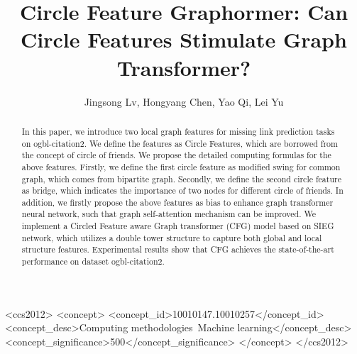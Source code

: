 \documentclass[sigconf]{acmart}
\begin{document}
\title{Circle Feature Graphormer: Can Circle Features Stimulate Graph Transformer?}

\author{Jingsong Lv, Hongyang Chen, Yao Qi, Lei Yu}

\renewcommand{\shortauthors}{Jingsong Lv, et al.}


\begin{abstract}
  In this paper, we introduce two local graph features for missing link prediction tasks on ogbl-citation2. We define the features as Circle Features, which are borrowed from the concept of circle of friends. We propose the detailed computing formulas for the above features. Firstly, we define the first circle feature as modified swing for common graph, which comes from bipartite graph. Secondly, we define the second circle feature as bridge, which indicates the importance of two nodes for different circle of friends. In addition, we firstly propose the above features as bias to enhance graph transformer neural network, such that graph self-attention mechanism can be improved. We implement a Circled Feature aware Graph transformer (CFG) model based on SIEG network, which utilizes a double tower structure to capture both global and local structure features. Experimental results show that CFG achieves the state-of-the-art performance on dataset ogbl-citation2.
\end{abstract}


\begin{CCSXML}
<ccs2012>
   <concept>
       <concept_id>10010147.10010257</concept_id>
       <concept_desc>Computing methodologies~Machine learning</concept_desc>
       <concept_significance>500</concept_significance>
       </concept>
 </ccs2012>
\end{CCSXML}



\maketitle
\end{document}

